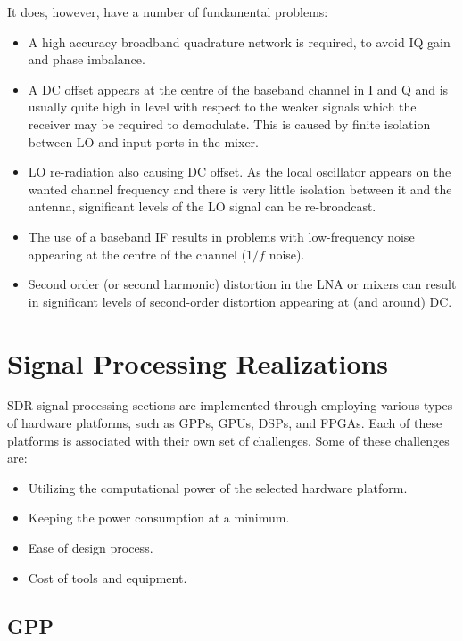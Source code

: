 It does, however, have a number of fundamental problems:
\begin{itemize}
  \item A high accuracy broadband quadrature network is required, to avoid IQ gain and phase imbalance.
  \item A DC offset appears at the centre of the baseband channel in I and Q and is usually quite high in level with respect to the weaker signals which the receiver may be required to demodulate. This is caused by finite isolation between LO and input ports in the mixer.
  \item LO re-radiation also causing DC offset. As the local oscillator appears on the wanted channel frequency and there is very little isolation between it and the antenna, significant levels of the LO signal can be re-broadcast.
  \item The use of a baseband IF results in problems with low-frequency noise appearing at the centre of the channel ($1/f$ noise).
  \item Second order (or second harmonic) distortion in the LNA or mixers can result in significant levels of second-order distortion appearing at (and around) DC.
\end{itemize}

\section{Signal Processing Realizations}
\label{sect:dsp_realizations}

SDR signal processing sections are implemented through employing various types of hardware platforms, such as GPPs, GPUs, DSPs, and FPGAs. Each of these platforms is associated with their own set of challenges. Some of these challenges are:
\begin{itemize}
  \item Utilizing the computational power of the selected hardware platform.
  \item Keeping the power consumption at a minimum.
  \item Ease of design process.
  \item Cost of tools and equipment.
\end{itemize}

\subsection{GPP}

